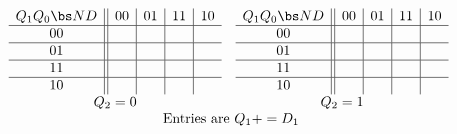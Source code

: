 \begin{description}
{            $$
            \begin{array}{cc}
                \begin{array} {c||c|c|c|c}
                    Q_1 Q_0 \bs ND    & 00 & 01 & 11 & 10 \\ \hline
                    00            &    &   &   &    \\ \hline
                    01            &    &   &   &    \\ \hline
                    11            &    &   &   &   \\ \hline
                    10            &    &   &   &    \\
                \end{array}
                &
                \begin{array} {c||c|c|c|c}
                    Q_1 Q_0 \bs ND    & 00 & 01 & 11 & 10 \\ \hline
                    00            &   &   &   &   \\ \hline
                    01            &   &   &   &   \\ \hline
                    11            &   &   &   &   \\ \hline
                    10            &   &   &   &   \\
                \end{array} \\
                Q_2=0 & Q_2=1 \\
                \multicolumn{2}{c}{\text{ Entries\ are\ } Q_1+=D_1}
            \end{array} $$

}
\end{description}
